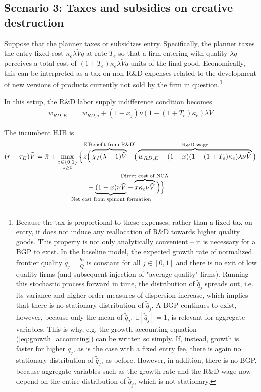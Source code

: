 \documentclass[11pt,english]{article}
\theoremstyle{remark}
\begin{document}
\subsection{Scenario 3: Taxes and subsidies on creative destruction}

Suppose that the planner taxes or subsidizes entry. Specifically, the planner taxes the entry fixed cost $\kappa_e \lambda \tilde{V} q$ at rate $T_e$ so that a firm entering with quality $\lambda q$ perceives a total cost of $(1+T_e) \kappa_e \lambda \tilde{V}q$ units of the final good. Economically, this can be interpreted as a tax on non-R\&D expenses related to the development of new versions of products currently not sold by the firm in question.\footnote{Because the tax is proportional to these expenses, rather than a fixed tax on entry, it does not induce any reallocation of R\&D towards higher quality goods. This property is not only analytically convenient -- it is necessary for a BGP to exist. In the baseline model, the expected growth rate of normalized frontier quality $\tilde{\bar{q}}_j = \frac{\bar{q}_j}{Q}$ is constant for all $j \in [0,1]$ and there is no exit of low quality firms (and subsequent injection of "average quality" firms). Running this stochastic process forward in time, the distribution of $\tilde{\bar{q}}_j$ spreads out, i.e. its variance and higher order measures of dispersion increase, which implies that there is no stationary distribution of $\tilde{\bar{q}}_j$. A BGP continues to exist, however, because only the mean of $\tilde{\bar{q}}_j$, $\mathbb{E}[\tilde{\bar{q}}_j] = 1$, is relevant for aggregate variables. This is why, e.g. the growth accounting equation (\ref{eq:growth_accounting}) can be written so simply. If, instead, growth is faster for higher $\tilde{\bar{q}}_j$, as is the case with a fixed entry fee, there is again no stationary distribution of $\tilde{\bar{q}}_j$, as before. However, in addition, there is no BGP, because aggregate variables such as the growth rate and the R\&D wage now depend on the entire distribution of $\tilde{\bar{q}}_j$, which is not stationary.}

In this setup, the R\&D labor supply indifference condition becomes
\begin{align}
	w_{RD,E} &= w_{RD,j} + (1-x_j) \nu (1-(1+T_e)\kappa_e) \lambda \tilde{V} \label{eq:RD_worker_indifference_entryTax}
\end{align}

The incumbent HJB is
\begin{align}
(r + \tau_E) \tilde{V} = \tilde{\pi} + \max_{\substack{x \in \{0,1\} \\ z \ge 0}} \Big\{z &\Big( \overbrace{\chi_I (\lambda - 1) \tilde{V}}^{\mathclap{\mathbb{E}[\textrm{Benefit from R\&D}]}}-  \big( \overbrace{w_{RD,E} - (1-x)(1-(1+T_e)\kappa_e)\lambda \nu \tilde{V}}^{\mathclap{\text{R\&D wage}}}\big) \label{eq:hjb_incumbent_entryTax} \nonumber \\ 
&-  \underbrace{(1-x) \nu \tilde{V}}_{\mathclap{\text{Net cost from spinout formation}}} - \overbrace{x \kappa_{c} \nu \tilde{V}}^{\mathclap{\text{Direct cost of NCA}}}\Big) \Big\} 
\end{align}
\end{document}

